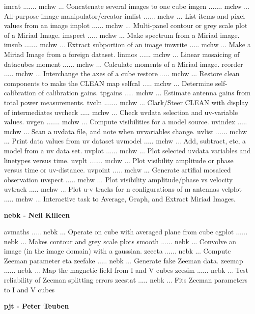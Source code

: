 {\eightpoint\begintt
imcat ....... mchw ... Concatenate several images to one cube 
imgen ....... mchw ... All-purpose image manipulator/creator 
imlist ...... mchw ... List items and pixel values from an image 
implot ...... mchw ... Multi-panel contour or grey scale plot of a Miriad Image.
imspect ..... mchw ... Make spectrum from a Miriad image. 
\endtt}
{\eightpoint\begintt
imsub ....... mchw ... Extract subportion of an image 
imwrite ..... mchw ... Make a Miriad Image from a foreign dataset.
linmos ...... mchw ... Linear mosaicing of datacubes 
moment ...... mchw ... Calculate moments of a Miriad image. 
reorder ..... mchw ... Interchange the axes of a cube 
\endtt}
{\eightpoint\begintt
restore ..... mchw ... Restore clean components to make the CLEAN map 
selfcal ..... mchw ... Determine self-calibration of calibration gains. 
tpgains ..... mchw ... Estimate antenna gains from total power measurements. 
tvcln ....... mchw ... Clark/Steer CLEAN with display of intermediates 
uvcheck ..... mchw ... Check uvdata selection and uv-variable values. 
\endtt}
{\eightpoint\begintt
uvgen ....... mchw ... Compute visibilities for a model source. 
uvindex ..... mchw ... Scan a uvdata file, and note when uvvariables change. 
uvlist ...... mchw ... Print data values from uv dataset 
uvmodel ..... mchw ... Add, subtract, etc, a model from a uv data set. 
uvplot ...... mchw ... Plot selected uvdata variables and linetypes versus time.
\endtt}
{\eightpoint\begintt
uvplt ....... mchw ... Plot visibility amplitude or phase versus time or uv-distance. 
uvpoint ..... mchw ... Generate artifial mosaiced observation 
uvspect ..... mchw ... Plot visibility amplitude/phase vs velocity 
uvtrack ..... mchw ... Plot u-v tracks for n configurations of m antennas 
velplot ..... mchw ... Interactive task to Average, Graph, and Extract Miriad Images. 
\endtt}
\par\centerline {\bf nebk - Neil Killeen}
{\eightpoint\begintt
avmaths ..... nebk ... Operate on cube with averaged plane from cube 
cgplot ...... nebk ... Makes contour and grey scale plots 
smooth ...... nebk ... Convolve an image (in the image domain) with a gaussian. 
zeeeta ...... nebk ... Compute Zeeman parameter eta 
zeefake ..... nebk ... Generate fake Zeeman data. 
\endtt}
{\eightpoint\begintt
zeemap ...... nebk ... Map the magnetic field from I and V cubes 
zeesim ...... nebk ... Test reliability of Zeeman splitting errors 
zeestat ..... nebk ... Fits Zeeman parameters to I and V cubes 
\endtt}
\par\centerline {\bf pjt - Peter Teuben}
